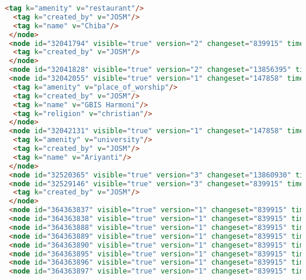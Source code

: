 \begin{lstlisting}[language=HTML,basicstyle=\tiny,caption=bandung1.xml]
  <tag k="amenity" v="restaurant"/>
  <tag k="created_by" v="JOSM"/>
  <tag k="name" v="Chiba"/>
 </node>
 <node id="32041794" visible="true" version="2" changeset="839915" timestamp="2009-03-21T14:20:08Z" user="adhitya" uid="7748" lat="-6.9049540" lon="107.5990764">
  <tag k="created_by" v="JOSM"/>
 </node>
 <node id="32041828" visible="true" version="2" changeset="13856395" timestamp="2012-11-13T08:27:46Z" user="yudiwbs" uid="268765" lat="-6.9028198" lon="107.5974882"/>
 <node id="32042055" visible="true" version="1" changeset="147858" timestamp="2007-07-16T21:25:13Z" user="adhitya" uid="7748" lat="-6.9045275" lon="107.5973424">
  <tag k="amenity" v="place_of_worship"/>
  <tag k="created_by" v="JOSM"/>
  <tag k="name" v="GBIS Harmoni"/>
  <tag k="religion" v="christian"/>
 </node>
 <node id="32042131" visible="true" version="1" changeset="147858" timestamp="2007-07-16T21:25:27Z" user="adhitya" uid="7748" lat="-6.9050969" lon="107.5973817">
  <tag k="amenity" v="university"/>
  <tag k="created_by" v="JOSM"/>
  <tag k="name" v="Ariyanti"/>
 </node>
 <node id="32520365" visible="true" version="3" changeset="13860930" timestamp="2012-11-13T15:42:42Z" user="yudiwbs" uid="268765" lat="-6.9068829" lon="107.5976578"/>
 <node id="32529146" visible="true" version="3" changeset="839915" timestamp="2009-03-21T14:16:03Z" user="adhitya" uid="7748" lat="-6.9071333" lon="107.6033567">
  <tag k="created_by" v="JOSM"/>
 </node>
 <node id="364363837" visible="true" version="1" changeset="839915" timestamp="2009-03-21T14:02:46Z" user="adhitya" uid="7748" lat="-6.9109164" lon="107.5979263"/>
 <node id="364363838" visible="true" version="1" changeset="839915" timestamp="2009-03-21T14:02:48Z" user="adhitya" uid="7748" lat="-6.9103801" lon="107.5978906"/>
 <node id="364363888" visible="true" version="1" changeset="839915" timestamp="2009-03-21T14:03:09Z" user="adhitya" uid="7748" lat="-6.9055397" lon="107.5965000"/>
 <node id="364363889" visible="true" version="1" changeset="839915" timestamp="2009-03-21T14:03:10Z" user="adhitya" uid="7748" lat="-6.9056185" lon="107.5965003"/>
 <node id="364363890" visible="true" version="1" changeset="839915" timestamp="2009-03-21T14:03:10Z" user="adhitya" uid="7748" lat="-6.9056188" lon="107.5964229"/>
 <node id="364363895" visible="true" version="1" changeset="839915" timestamp="2009-03-21T14:03:14Z" user="adhitya" uid="7748" lat="-6.9057778" lon="107.5964236"/>
 <node id="364363896" visible="true" version="1" changeset="839915" timestamp="2009-03-21T14:03:15Z" user="adhitya" uid="7748" lat="-6.9057775" lon="107.5964918"/>
 <node id="364363897" visible="true" version="1" changeset="839915" timestamp="2009-03-21T14:03:17Z" user="adhitya" uid="7748" lat="-6.9061063" lon="107.5964919"/>

\end{lstlisting}

